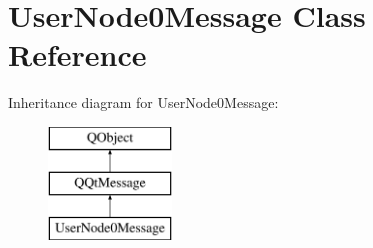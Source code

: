 \hypertarget{class_user_node0_message}{}\section{User\+Node0\+Message Class Reference}
\label{class_user_node0_message}
Inheritance diagram for User\+Node0\+Message\+:\begin{figure}[H]
\begin{center}
\leavevmode
\includegraphics[height=3.000000cm]{class_user_node0_message}
\end{center}
\end{figure}
